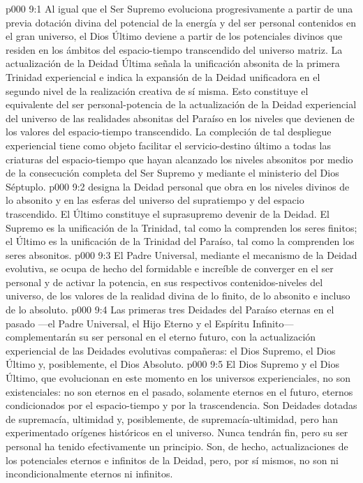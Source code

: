 \vs p000 9:1 Al igual que el Ser Supremo evoluciona progresivamente a partir de una previa dotación divina del potencial de la energía y del ser personal contenidos en el gran universo, el Dios Último deviene a partir de los potenciales divinos que residen en los ámbitos del espacio\hyp{}tiempo transcendido del universo matriz. La actualización de la Deidad Última señala la unificación absonita de la primera Trinidad experiencial e indica la expansión de la Deidad unificadora en el segundo nivel de la realización creativa de sí misma. Esto constituye el equivalente del ser personal\hyp{}potencia de la actualización de la Deidad experiencial del universo de las realidades absonitas del Paraíso en los niveles que devienen de los valores del espacio\hyp{}tiempo transcendido. La compleción de tal despliegue experiencial tiene como objeto facilitar el servicio\hyp{}destino último a todas las criaturas del espacio\hyp{}tiempo que hayan alcanzado los niveles absonitos por medio de la consecución completa del Ser Supremo y mediante el ministerio del Dios Séptuplo.
\vs p000 9:2 \pc {} designa la Deidad personal que obra en los niveles divinos de lo absonito y en las esferas del universo del supratiempo y del espacio trascendido. El Último constituye el suprasupremo devenir de la Deidad. El Supremo es la unificación de la Trinidad, tal como la comprenden los seres finitos; el Último es la unificación de la Trinidad del Paraíso, tal como la comprenden los seres absonitos.
\vs p000 9:3 El Padre Universal, mediante el mecanismo de la Deidad evolutiva, se ocupa de hecho del formidable e increíble  de converger en el ser personal y de activar la potencia, en sus respectivos contenidos\hyp{}niveles del universo, de los valores de la realidad divina de lo finito, de lo absonito e incluso de lo absoluto.
\vs p000 9:4 Las primeras tres Deidades del Paraíso eternas en el pasado ---el Padre Universal, el Hijo Eterno y el Espíritu Infinito--- complementarán su ser personal en el eterno futuro, con la actualización experiencial de las Deidades evolutivas compañeras: el Dios Supremo, el Dios Último y, posiblemente, el Dios Absoluto.
\vs p000 9:5 \pc El Dios Supremo y el Dios Último, que evolucionan en este momento en los universos experienciales, no son existenciales: no son eternos en el pasado, solamente eternos en el futuro, eternos condicionados por el espacio\hyp{}tiempo y por la trascendencia. Son Deidades dotadas de supremacía, ultimidad y, posiblemente, de supremacía\hyp{}ultimidad, pero han experimentado orígenes históricos en el universo. Nunca tendrán fin, pero su ser personal ha tenido efectivamente un principio. Son, de hecho, actualizaciones de los potenciales eternos e infinitos de la Deidad, pero, por sí mismos, no son ni incondicionalmente eternos ni infinitos.
